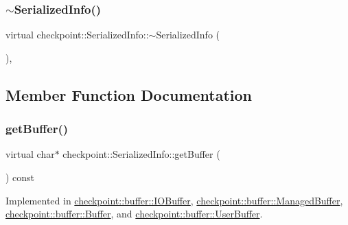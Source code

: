 \subsubsection{\texorpdfstring{$\sim$\+Serialized\+Info()}{~SerializedInfo()}}
{\footnotesize\ttfamily virtual checkpoint\+::\+Serialized\+Info\+::$\sim$\+Serialized\+Info (\begin{DoxyParamCaption}{ }\end{DoxyParamCaption})\hspace{0.3cm}{\ttfamily [inline]}, {\ttfamily [virtual]}}



\subsection{Member Function Documentation}
\mbox{\label{structcheckpoint_1_1_serialized_info_aa941e773b665a69a856996d243e7f2c7}} 
\subsubsection{\texorpdfstring{get\+Buffer()}{getBuffer()}}
{\footnotesize\ttfamily virtual char$\ast$ checkpoint\+::\+Serialized\+Info\+::get\+Buffer (\begin{DoxyParamCaption}{ }\end{DoxyParamCaption}) const\hspace{0.3cm}{\ttfamily [pure virtual]}}



Implemented in \hyperlink{structcheckpoint_1_1buffer_1_1_i_o_buffer_ac0ff5457dbbec216ce8620ad25e283fa}{checkpoint\+::buffer\+::\+I\+O\+Buffer}, \hyperlink{structcheckpoint_1_1buffer_1_1_managed_buffer_a9a44d0c4e088ac080f13c84072a86e91}{checkpoint\+::buffer\+::\+Managed\+Buffer}, \hyperlink{structcheckpoint_1_1buffer_1_1_buffer_a11fcf5b280408aef29cd21dd722006c3}{checkpoint\+::buffer\+::\+Buffer}, and \hyperlink{structcheckpoint_1_1buffer_1_1_user_buffer_a1a71a6378472d56c8c17f01dd44462b7}{checkpoint\+::buffer\+::\+User\+Buffer}.

\mbox{\label{structcheckpoint_1_1_serialized_info_a7550340904d20dd612100fb37d1d4452}} 
